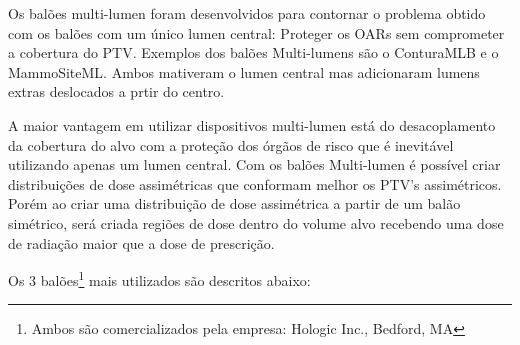 \documentclass[11pt,a4paper]{article}
\begin{document}
			Os balões multi-lumen foram desenvolvidos para contornar o problema obtido com os balões com um único lumen central: Proteger os OARs sem comprometer a cobertura do PTV. Exemplos dos balões Multi-lumens são o ConturaMLB e o MammoSiteML. Ambos mativeram o lumen central mas adicionaram lumens extras deslocados a prtir do centro. 

			A maior vantagem em utilizar dispositivos multi-lumen está do desacoplamento da cobertura do alvo com a proteção dos órgãos de risco que é inevitável utilizando apenas um lumen central. Com os balões Multi-lumen é possível criar distribuições de dose assimétricas que conformam melhor os PTV's assimétricos. Porém ao criar uma distribuição de dose assimétrica a partir de um balão simétrico, será criada regiões de dose dentro do volume alvo recebendo uma dose de radiação maior que a dose de prescrição.

			Os 3 balões\footnote{Ambos são comercializados pela empresa: Hologic Inc., Bedford, MA} mais utilizados são descritos abaixo:
			
\end{document}
